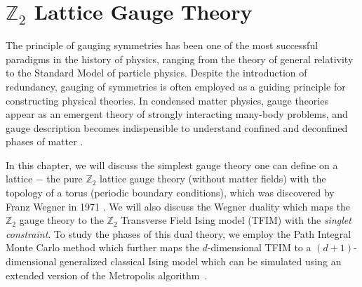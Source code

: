 \documentclass[../thesis_main.tex]{subfiles}
\begin{document}
\chapter{$\mathbb{Z}_2$ Lattice Gauge Theory}
The principle of gauging symmetries has been one of the most successful paradigms in the history of physics, ranging from the theory of general relativity to the Standard Model of particle physics. Despite the introduction of redundancy, gauging of symmetries is often employed as a guiding principle for constructing physical theories. In condensed matter physics, gauge theories appear as an emergent theory of strongly interacting many-body problems, and gauge description becomes indispensible to understand confined and deconfined phases of matter \cite{Sergej,Mathur_et_al}. 

In this chapter, we will discuss the simplest gauge theory one can define on a lattice $-$ the pure $\mathbb{Z}_2$ lattice gauge theory (without matter fields) with the topology of a torus (periodic boundary conditions), which was discovered by Franz Wegner in 1971 \cite{wegner2014duality}. We will also discuss the Wegner duality which maps the $\mathbb{Z}_2$ gauge theory to the $\mathbb{Z}_2$ Transverse Field Ising model (TFIM) with the \textit{singlet constraint}. To study the phases of this dual theory, we employ the Path Integral Monte Carlo method which further maps the $d$-dimensional TFIM to a $(d+1)$-dimensional generalized classical Ising model which can be simulated using an extended version of the Metropolis algorithm~\cite{gupta_pragati.}.
\end{document}
